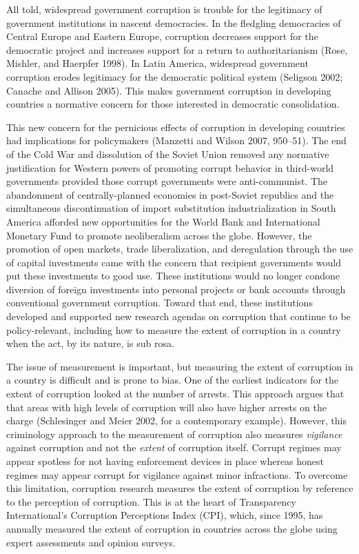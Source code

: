 \documentclass[11pt,]{article}
\begin{document}
All told, widespread government corruption is trouble for the legitimacy
of government institutions in nascent democracies. In the fledgling
democracies of Central Europe and Eastern Europe, corruption decreases
support for the democratic project and increases support for a return to
authoritarianism (Rose, Mishler, and Haerpfer 1998). In Latin America,
widespread government corruption erodes legitimacy for the democratic
political system (Seligson 2002; Canache and Allison 2005). This makes
government corruption in developing countries a normative concern for
those interested in democratic consolidation.

This new concern for the pernicious effects of corruption in developing
countries had implications for policymakers (Manzetti and Wilson 2007,
950--51). The end of the Cold War and dissolution of the Soviet Union
removed any normative justification for Western powers of promoting
corrupt behavior in third-world governments provided those corrupt
governments were anti-communist. The abandonment of centrally-planned
economies in post-Soviet republics and the simultaneous discontinuation
of import substitution industrialization in South America afforded new
opportunities for the World Bank and International Monetary Fund to
promote neoliberalism across the globe. However, the promotion of open
markets, trade liberalization, and deregulation through the use of
capital investments came with the concern that recipient governments
would put these investments to good use. These institutions would no
longer condone diversion of foreign investments into personal projects
or bank accounts through conventional government corruption. Toward that
end, these institutions developed and supported new research agendas on
corruption that continue to be policy-relevant, including how to measure
the extent of corruption in a country when the act, by its nature, is
sub rosa.

The issue of measurement is important, but measuring the extent of
corruption in a country is difficult and is prone to bias. One of the
earliest indicators for the extent of corruption looked at the number of
arrests. This approach argues that that areas with high levels of
corruption will also have higher arrests on the charge (Schlesinger and
Meier 2002, for a contemporary example). However, this criminology
approach to the measurement of corruption also measures \emph{vigilance}
against corruption and not the \emph{extent} of corruption itself.
Corrupt regimes may appear spotless for not having enforcement devices
in place whereas honest regimes may appear corrupt for vigilance against
minor infractions. To overcome this limitation, corruption research
measures the extent of corruption by reference to the perception of
corruption. This is at the heart of Transparency International's
Corruption Perceptions Index (CPI), which, since 1995, has annually
measured the extent of corruption in countries across the globe using
expert assessments and opinion surveys.
\end{document}

